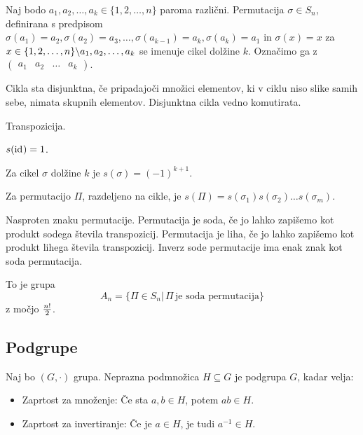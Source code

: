 Naj bodo $a_1, a_2, \ldots, a_k \in \{1, 2, \ldots, n\}$ paroma različni. Permutacija $\sigma \in S_n$, definirana s predpisom $\sigma(a_1) = a_2, \sigma(a_2) = a_3, \ldots, \sigma(a_{k-1}) = a_k, \sigma(a_k) = a_1$ in $\sigma(x) = x$ za $x \in \{1, 2, \ldots, n\} \backslash {a_1, a_2, \ldots, a_k}$ se imenuje cikel dolžine $k$. Označimo ga z $\begin{pmatrix}
a_1 & a_2 & \ldots & a_k
\end{pmatrix}$.


Cikla sta disjunktna, če pripadajoči množici elementov, ki v ciklu niso slike samih sebe, nimata skupnih elementov. Disjunktna cikla vedno komutirata.


Transpozicija.


$s(\mathrm{id}_{} ) = 1$.

Za cikel $\sigma$ dolžine $k$ je $s(\sigma) = (-1)^{k+1}.$

Za permutacijo $\Pi$, razdeljeno na cikle, je $s(\Pi) = s(\sigma_1) s(\sigma_2) \ldots s(\sigma_m)$.


Nasproten znaku permutacije. Permutacija je soda, če jo lahko zapišemo kot produkt sodega števila transpozicij. Permutacija je liha, če jo lahko zapišemo kot produkt lihega števila transpozicij. Inverz sode permutacije ima enak znak kot soda permutacija.


To je grupa \[
	A_n = \{\Pi \in S_n | \, \Pi \, \text{je soda permutacija}\}
\] z močjo $n! \over 2$.

\subsection{Podgrupe}


Naj bo $(G, \cdot)$ grupa. Neprazna podmnožica $H \subseteq G$ je podgrupa $G$, kadar velja:

\begin{itemize}
	\item Zaprtost za množenje: Če sta $a, b \in H$, potem $ab \in H$.
	\item Zaprtost za invertiranje: Če je $a \in H$, je tudi $a^{-1} \in H$.
\end{itemize}

